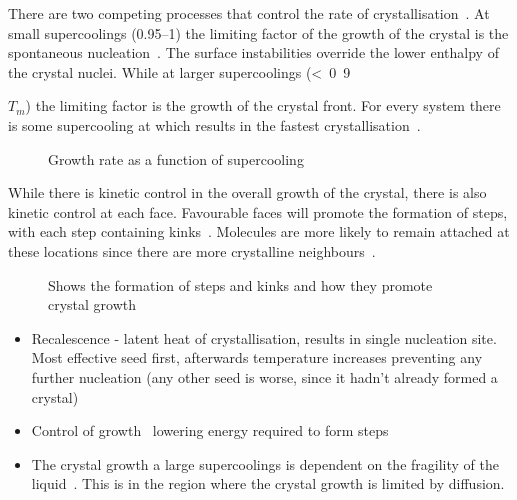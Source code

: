 There are two competing processes that control the rate of crystallisation~\cite{turnbull:69,ediger:08}. At small supercoolings (\SIrange{0.95}{1}{\Tm}) the limiting factor of the growth of the crystal is the spontaneous nucleation~. The surface instabilities override the lower enthalpy of the crystal nuclei. While at larger supercoolings (\si{< 0.9}{$T_m$) the limiting factor is the growth of the crystal front. For every system there is some supercooling at which results in the fastest crystallisation~\cite{uhlmann:72}.

\begin{figure}
    \caption{Growth rate as a function of supercooling}
    \label{fig:crys growth}
\end{figure}

\begin{figure}
\end{figure}

While there is kinetic control in the overall growth of the crystal, there is also kinetic control at each face. Favourable faces will promote the formation of steps, with each step containing kinks~. Molecules are more likely to remain attached at these locations since there are more crystalline neighbours~\cite{chernov:61}.

\begin{figure}
    \caption{Shows the formation of steps and kinks and how they promote crystal growth}
    \label{fig:steps}
\end{figure}

\begin{itemize}

    \item Recalescence - latent heat of crystallisation, results in single nucleation site.~\cite{turnbull:69} Most effective seed first, afterwards temperature increases preventing any further nucleation (any other seed is worse, since it hadn't already formed a crystal)

    \item Control of growth~\cite{de-yoreo:03} lowering energy required to form steps

    \item The crystal growth a large supercoolings is dependent on the fragility of the liquid~\cite{ediger:08}. This is in the region where the crystal growth is limited by diffusion. 


\end{itemize}}

